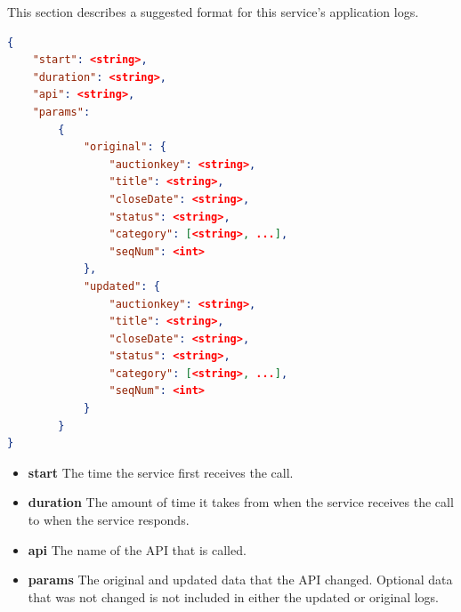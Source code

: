 \documentclass[12pt,a4paper]{article}
\begin{document}
This section describes a suggested format for this service's application logs.


\begin{lstlisting}[boxpos=t,language=json,firstnumber=1]
{
    "start": <string>,
    "duration": <string>,
    "api": <string>,
    "params":
        {
            "original": {
                "auctionkey": <string>,
                "title": <string>,
                "closeDate": <string>,
                "status": <string>, 
                "category": [<string>, ...],
                "seqNum": <int> 
            }, 
            "updated": {
                "auctionkey": <string>,
                "title": <string>,
                "closeDate": <string>,
                "status": <string>,
                "category": [<string>, ...],
                "seqNum": <int> 
            }
        }
}           
\end{lstlisting}

\begin{itemize}
    \item \textbf{start} The time the service first receives the call.
    \item \textbf{duration} The amount of time it takes from when the service
        receives the call to when the service responds.
    \item \textbf{api} The name of the API that is called.
    \item \textbf{params} The original and updated data that the API changed.
        Optional data that was not changed is not included in either the
        updated or original logs.
\end{itemize}
\end{document}
